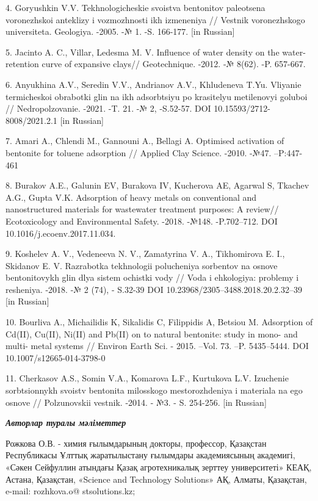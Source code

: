 4. Goryushkin V.V. Tekhnologicheskie svoistva bentonitov paleotsena
voronezhskoi anteklizy i vozmozhnosti ikh izmeneniya // Vestnik
voronezhskogo universiteta. Geologiya. -2005. -№ 1. -S. 166-177. {[}in
Russian{]}

5. Jacinto A. C., Villar, Ledesma M. V. Influence of water density on
the water-retention curve of expansive clays// Geotechnique. -2012. -№
8(62). -P. 657-667.

6. Anyukhina A.V., Seredin V.V., Andrianov A.V., Khludeneva T.Yu.
Vliyanie termicheskoi obrabotki glin na ikh adsorbtsiyu po krasitelyu
metilenovyi goluboi // Nedropol\textquotesingle zovanie. -2021. -T. 21.
-№ 2, -S.52-57. DOI 10.15593/2712-8008/2021.2.1 {[}in Russian{]}

7. Amari A., Chlendi M., Gannouni A., Bellagi A. Optimised activation of
bentonite for toluene adsorption // Applied Clay Science. -2010. -№47.
--P:447-461

8. Burakov A.E., Galunin EV, Burakova IV, Kucherova AE, Agarwal S,
Tkachev A.G., Gupta V.K. Adsorption of heavy metals on conventional and
nanostructured materials for wastewater treatment purposes: A review//
Ecotoxicology and Environmental Safety. -2018. -№148. -P.702--712. DOI
10.1016/j.ecoenv.2017.11.034.

9. Koshelev A. V., Vedeneeva N. V., Zamatyrina V. A., Tikhomirova E. I.,
Skidanov E. V. Razrabotka tekhnologii polucheniya sorbentov na osnove
bentonitovykh glin dlya sistem ochistki vody // Voda i ehkologiya:
problemy i resheniya. -2018. -№ 2 (74), - S.32-39 DOI
10.23968/2305--3488.2018.20.2.32--39 {[}in Russian{]}

10. Bourliva A., Michailidis K, Sikalidis C, Filippidis A, Betsiou M.
Adsorption of Cd(II), Cu(II), Ni(II) and Pb(II) on to natural bentonite:
study in mono- and multi- metal systems // Environ Earth Sci. - 2015.
--Vol. 73. --P. 5435--5444. DOI 10.1007/s12665-014-3798-0

11. Cherkasov A.S., Somin V.A., Komarova L.F., Kurtukova L.V. Izuchenie
sorbtsionnykh svoistv bentonita milosskogo mestorozhdeniya i materiala
na ego osnove // Polzunovskii vestnik. -2014. - №3. - S. 254-256. {[}in
Russian{]}

\emph{\textbf{Авторлар туралы мәліметтер}}

Рожкова О.В. - химия ғылымдарының докторы, профессор, Қазақстан
Республикасы Ұлттық жаратылыстану ғылымдары академиясының академигі,
«Сәкен Сейфуллин атындағы Қазақ агротехникалық зерттеу университеті»
КЕАҚ, Астана, Қазақстан, «Science and Technology Solutions» АҚ, Алматы,
Қазақстан, e-mail: rozhkova.o@ stsolutions.kz;


